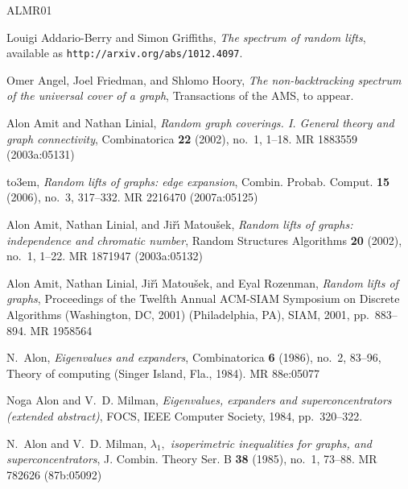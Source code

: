 \documentclass{memo-l}
\theoremstyle{plain}
\theoremstyle{definition}
\numberwithin{section}{chapter}
\numberwithin{equation}{chapter}
\theoremstyle{plain}
\theoremstyle{definition}
\begin{document}
\newcommand{\etalchar}[1]{$^{#1}$}
\providecommand{\bysame}{\leavevmode\hbox to3em{\hrulefill}\thinspace}
\providecommand{\MR}{\relax\ifhmode\unskip\space\fi MR }
\providecommand{\MRhref}[2]{%
  \href{http://www.ams.org/mathscinet-getitem?mr=#1}{#2}
}
\providecommand{\href}[2]{#2}
\begin{thebibliography}{ALMR01}

Louigi Addario-Berry and Simon Griffiths, \emph{The spectrum of random lifts},
  available as {\tt http://arxiv.org/abs/1012.4097}.

Omer Angel, Joel Friedman, and Shlomo Hoory, \emph{The non-backtracking
  spectrum of the universal cover of a graph}, Transactions of the AMS, to
  appear.

Alon Amit and Nathan Linial, \emph{Random graph coverings. {I}. {G}eneral
  theory and graph connectivity}, Combinatorica \textbf{22} (2002), no.~1,
  1--18. \MR{1883559 (2003a:05131)}

\bysame, \emph{Random lifts of graphs: edge expansion}, Combin. Probab. Comput.
  \textbf{15} (2006), no.~3, 317--332. \MR{2216470 (2007a:05125)}

Alon Amit, Nathan Linial, and Ji{\v{r}}{\'{\i}} Matou{\v{s}}ek, \emph{Random
  lifts of graphs: independence and chromatic number}, Random Structures
  Algorithms \textbf{20} (2002), no.~1, 1--22. \MR{1871947 (2003a:05132)}

Alon Amit, Nathan Linial, Ji{\v{r}}{\'{\i}} Matou{\v{s}}ek, and Eyal Rozenman,
  \emph{Random lifts of graphs}, Proceedings of the {T}welfth {A}nnual
  {ACM}-{SIAM} {S}ymposium on {D}iscrete {A}lgorithms ({W}ashington, {DC},
  2001) (Philadelphia, PA), SIAM, 2001, pp.~883--894. \MR{1958564}

N.~Alon, \emph{Eigenvalues and expanders}, Combinatorica \textbf{6} (1986),
  no.~2, 83--96, Theory of computing (Singer Island, Fla., 1984).
  \MR{88e:05077}

Noga Alon and V.~D. Milman, \emph{Eigenvalues, expanders and superconcentrators
  (extended abstract)}, FOCS, IEEE Computer Society, 1984, pp.~320--322.

N.~Alon and V.~D. Milman, \emph{{$\lambda_1,$} isoperimetric inequalities for
  graphs, and superconcentrators}, J. Combin. Theory Ser. B \textbf{38} (1985),
  no.~1, 73--88. \MR{782626 (87b:05092)}


\end{thebibliography}
\end{document}
